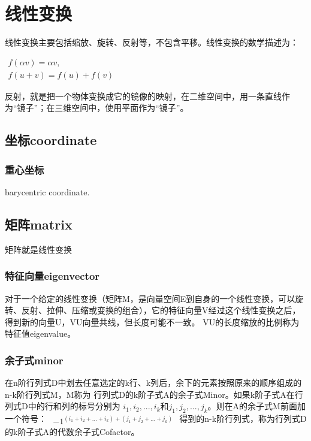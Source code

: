 
\clearpage
\section{线性变换}
线性变换主要包括缩放、旋转、反射等，不包含平移。线性变换的数学描述为：

\begin{math}
\begin{aligned}
f(\alpha v)=\alpha v, \\
f(u+v)=f(u)+f(v)
\end{aligned}
\end{math}

反射，就是把一个物体变换成它的镜像的映射，在二维空间中，用一条直线作为“镜子”；在三维空间中，使用平面作为“镜子”。

\subsection{ 坐标coordinate}

\subsubsection{重心坐标}
barycentric coordinate.


\subsection{ 矩阵matrix }
矩阵就是线性变换
\subsubsection{特征向量eigenvector}
对于一个给定的线性变换（矩阵M，是向量空间E到自身的一个线性变换，可以旋转、反射、拉伸、压缩或变换的组合），它的特征向量V经过这个线性变换之后，得到新的向量U，VU向量共线，但长度可能不一致。
VU的长度缩放的比例称为特征值eigenvalue。

\subsubsection{余子式minor}
在n阶行列式D中划去任意选定的k行、k列后，余下的元素按照原来的顺序组成的n-k阶行列式M，M称为
行列式D的k阶子式A的余子式Minor。如果k阶子式A在行列式D中的行和列的标号分别为
$i_{1},i_{2},...,i_{k}$和$j_{1},j_{2},...,j_{k}$。则在A的余子式M前面加一个符号：
\begin{math}
    \begin{aligned}
        {-1}^{(i_{1}+i_{2}+...+i_{k}) + (j_{1}+j_{2}+...+j_{k})}
    \end{aligned}
\end{math}
得到的n-k阶行列式，称为行列式D的k阶子式A的代数余子式Cofactor。


